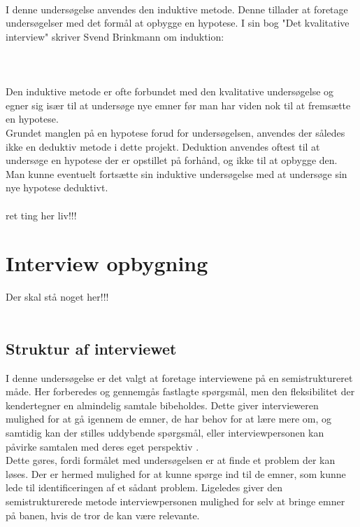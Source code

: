 \\ 
I denne undersøgelse anvendes den induktive metode. Denne tillader at foretage undersøgelser med det formål at opbygge en hypotese. 
I sin bog "Det kvalitative interview" skriver Svend Brinkmann om induktion:
\\
\\
 \citep{brinkmann2014}
\\
\\
Den induktive metode er ofte forbundet med den kvalitative undersøgelse og egner sig især til at undersøge nye emner før man har viden nok til at fremsætte en hypotese. 
\\
Grundet manglen på en hypotese forud for undersøgelsen, anvendes der således ikke en deduktiv metode i dette projekt. Deduktion anvendes oftest til at undersøge en hypotese der er opstillet på forhånd, og ikke til at opbygge den. Man kunne eventuelt fortsætte sin induktive undersøgelse med at undersøge sin nye hypotese deduktivt. 
\\ \\
ret ting her liv!!!


\section{Interview opbygning}
Der skal stå noget her!!! \\
\\



\subsection {Struktur af interviewet}
I denne undersøgelse er det valgt at foretage interviewene på en semistruktureret måde. Her forberedes og gennemgås fastlagte spørgsmål,  men den fleksibilitet der kendertegner en almindelig samtale bibeholdes. Dette giver intervieweren mulighed for at gå igennem de emner, de har behov for at lære mere om, og samtidig kan der stilles uddybende spørgsmål, eller interviewpersonen kan påvirke samtalen med deres eget perspektiv \citep{brinkmann2014}.\\
Dette gøres, fordi formålet med undersøgelsen er at finde et problem der kan løses. Der er hermed mulighed for at kunne spørge ind til de emner, som kunne lede til identificeringen af et sådant problem. Ligeledes giver den semistrukturerede metode interviewpersonen mulighed for selv at bringe emner på banen, hvis de tror de kan være relevante.

